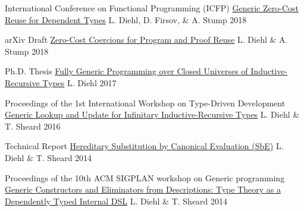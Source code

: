 

\begin{cventries}

  \cventry
    {International Conference on Functional Programming (ICFP)} %
    {\href{https://github.com/larrytheliquid/generic-reuse}{Generic Zero-Cost Reuse for Dependent Types}} %
    {L. Diehl, D. Firsov, \& A. Stump} %
    {2018} %
    {}

  \cventry
    {arXiv Draft} %
    {\href{https://github.com/larrytheliquid/zero-cost-coercions}{Zero-Cost Coercions for Program and Proof Reuse}} %
    {L. Diehl \& A. Stump} %
    {2018} %
    {}

  \cventry
    {Ph.D. Thesis} %
    {\href{https://github.com/larrytheliquid/thesis}{Fully Generic Programming over Closed Universes of Inductive-Recursive Types}} %
    {L. Diehl} %
    {2017} %
    {}

  \cventry
    {Proceedings of the 1st International Workshop on Type-Driven Development} %
    {\href{https://github.com/larrytheliquid/infir}{Generic Lookup and Update for Infinitary Inductive-Recursive Types}} %
    {L. Diehl \& T. Sheard} %
    {2016} %
    {}

  \cventry
    {Technical Report} %
    {\href{https://github.com/larrytheliquid/sbe}{Hereditary Substitution by Canonical Evaluation (SbE)}} %
    {L. Diehl \& T. Sheard} %
    {2014} %
    {}

  \cventry
    {Proceedings of the 10th ACM SIGPLAN workshop on Generic programming} %
    {\href{https://github.com/larrytheliquid/generic-elim}{Generic Constructors and Eliminators from Descriptions: {\tiny Type Theory as a Dependently Typed Internal DSL}}} %
    {L. Diehl \& T. Sheard} %
    {2014} %
    {}



\end{cventries}
